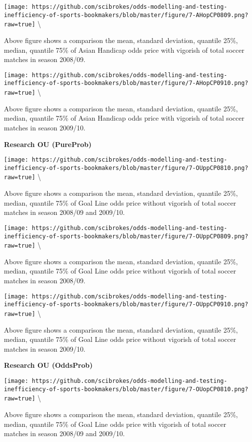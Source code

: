\documentclass[article]{jss}
\begin{document}
\texttt{[image: https://github.com/scibrokes/odds-modelling-and-testing-inefficiency-of-sports-bookmakers/blob/master/figure/7-AHopCP0809.png?raw=true]}
\textbackslash{}

Above figure shows a comparison the mean, standard deviation, quantile
25\%, median, quantile 75\% of Asian Handicap odds price with vigorish
of total soccer matches in season 2008/09.

\texttt{[image: https://github.com/scibrokes/odds-modelling-and-testing-inefficiency-of-sports-bookmakers/blob/master/figure/7-AHopCP0910.png?raw=true]}
\textbackslash{}

Above figure shows a comparison the mean, standard deviation, quantile
25\%, median, quantile 75\% of Asian Handicap odds price with vigorish
of total soccer matches in season 2009/10. \bigbreak

\textbf{Research OU (PureProb)} \bigbreak

\texttt{[image: https://github.com/scibrokes/odds-modelling-and-testing-inefficiency-of-sports-bookmakers/blob/master/figure/7-OUppCP0810.png?raw=true]}
\textbackslash{}

Above figure shows a comparison the mean, standard deviation, quantile
25\%, median, quantile 75\% of Goal Line odds price without vigorish of
total soccer matches in season 2008/09 and 2009/10.

\texttt{[image: https://github.com/scibrokes/odds-modelling-and-testing-inefficiency-of-sports-bookmakers/blob/master/figure/7-OUppCP0809.png?raw=true]}
\textbackslash{}

Above figure shows a comparison the mean, standard deviation, quantile
25\%, median, quantile 75\% of Goal Line odds price without vigorish of
total soccer matches in season 2008/09.

\texttt{[image: https://github.com/scibrokes/odds-modelling-and-testing-inefficiency-of-sports-bookmakers/blob/master/figure/7-OUppCP0910.png?raw=true]}
\textbackslash{}

Above figure shows a comparison the mean, standard deviation, quantile
25\%, median, quantile 75\% of Goal Line odds price without vigorish of
total soccer matches in season 2009/10. \bigbreak

\textbf{Research OU (OddsProb)} \bigbreak

\texttt{[image: https://github.com/scibrokes/odds-modelling-and-testing-inefficiency-of-sports-bookmakers/blob/master/figure/7-OUopCP0810.png?raw=true]}
\textbackslash{}

Above figure shows a comparison the mean, standard deviation, quantile
25\%, median, quantile 75\% of Goal Line odds price with vigorish of
total soccer matches in season 2008/09 and 2009/10.
\end{document}
